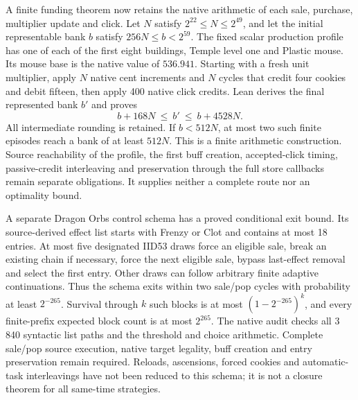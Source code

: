 \documentclass[11pt,a4paper]{article}
\numberwithin{equation}{section}
\theoremstyle{definition}
\theoremstyle{remark}
\begin{document}
A finite funding theorem now retains the native arithmetic of each sale, purchase, multiplier update and click. Let $N$ satisfy $2^{22}\leq N\leq2^{49}$, and let the initial representable bank $b$ satisfy $256N\leq b<2^{59}$. The fixed scalar production profile has one of each of the first eight buildings, Temple level one and Plastic mouse. Its mouse base is the native value of $536.941$. Starting with a fresh unit multiplier, apply $N$ native cent increments and $N$ cycles that credit four cookies and debit fifteen, then apply 400 native click credits. Lean derives the final represented bank $b'$ and proves
\[
 b+168N\ \leq\ b'\ \leq\ b+4528N.
\]
All intermediate rounding is retained. If $b<512N$, at most two such finite episodes reach a bank of at least $512N$. This is a finite arithmetic construction. Source reachability of the profile, the first buff creation, accepted-click timing, passive-credit interleaving and preservation through the full store callbacks remain separate obligations. It supplies neither a complete route nor an optimality bound.

A separate Dragon Orbs control schema has a proved conditional exit bound. Its source-derived effect list starts with Frenzy or Clot and contains at most 18 entries. At most five designated IID53 draws force an eligible sale, break an existing chain if necessary, force the next eligible sale, bypass last-effect removal and select the first entry. Other draws can follow arbitrary finite adaptive continuations. Thus the schema exits within two sale/pop cycles with probability at least $2^{-265}$. Survival through $k$ such blocks is at most $(1-2^{-265})^k$, and every finite-prefix expected block count is at most $2^{265}$. The native audit checks all 3\,840 syntactic list paths and the threshold and choice arithmetic. Complete sale/pop source execution, native target legality, buff creation and entry preservation remain required. Reloads, ascensions, forced cookies and automatic-task interleavings have not been reduced to this schema; it is not a closure theorem for all same-time strategies.
\end{document}
